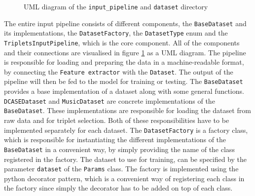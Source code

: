 \begin{figure}[ht]
{
    }
	\caption{UML diagram of the \texttt{input\_pipeline} and \texttt{dataset} directory}
	\label{fig:UML-Input-Pipeline}
\end{figure}
\noindent
The entire input pipeline consists of different components, the \texttt{BaseDataset} and its implementations, the \texttt{DatasetFactory}, the \texttt{DatasetType} enum and the \texttt{TripletsInputPipeline}, which is the core component. All of the components and their connections are visualised in figure \ref{fig:UML-Input-Pipeline} as a UML diagram. The pipeline is responsible for loading and preparing the data in a machine-readable format, by connecting the \texttt{Feature extractor} with the \texttt{Dataset}. The output of the pipeline will then be fed to the model for training or testing.
\newline
\newline
The \texttt{BaseDataset} provides a base implementation of a dataset along with some general functions. \texttt{DCASEDataset} and \texttt{MusicDataset} are concrete implementations of the \texttt{BaseDataset}. These implementations are responsible for loading the dataset from raw data and for triplet selection. Both of these responsibilities have to be implemented separately for each dataset. The \texttt{DatasetFactory} is a factory class, which is responsible for instantiating the different implementations of the \texttt{BaseDataset} in a convenient way, by simply providing the name of the class registered in the factory. The dataset to use for training, can be specified by the parameter \texttt{dataset} of the \texttt{Params} class. The factory is implemented using the python decorator pattern, which is a convenient way of registering each class in the factory since simply the decorator has to be added on top of each class.

